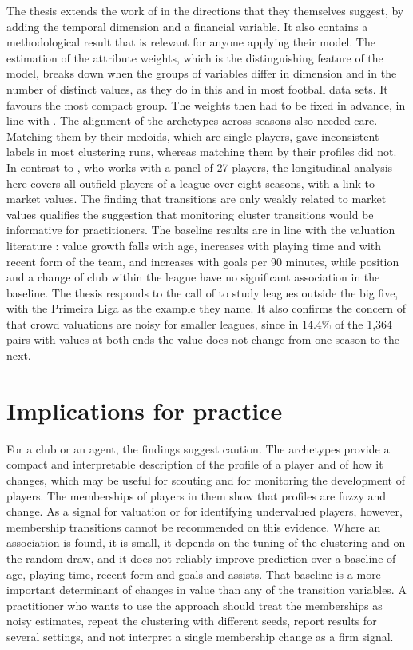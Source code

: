 The thesis extends the work of  in the directions that they themselves suggest, by adding the temporal dimension and a financial variable. It also contains a methodological result that is relevant for anyone applying their model. The estimation of the attribute weights, which is the distinguishing feature of the model, breaks down when the groups of variables differ in dimension and in the number of distinct values, as they do in this and in most football data sets. It favours the most compact group. The weights then had to be fixed in advance, in line with . The alignment of the archetypes across seasons also needed care. Matching them by their medoids, which are single players, gave inconsistent labels in most clustering runs, whereas matching them by their profiles did not. In contrast to , who works with a panel of 27 players, the longitudinal analysis here covers all outfield players of a league over eight seasons, with a link to market values. The finding that transitions are only weakly related to market values qualifies the suggestion that monitoring cluster transitions would be informative for practitioners. The baseline results are in line with the valuation literature \cite{franceschi2024determinants}: value growth falls with age, increases with playing time and with recent form of the team, and increases with goals per 90 minutes, while position and a change of club within the league have no significant association in the baseline. The thesis responds to the call of  to study leagues outside the big five, with the Primeira Liga as the example they name. It also confirms the concern of  that crowd valuations are noisy for smaller leagues, since in 14.4\% of the 1,364 pairs with values at both ends the value does not change from one season to the next.

\section{Implications for practice}
\label{sec:disc-practice}

For a club or an agent, the findings suggest caution. The archetypes provide a compact and interpretable description of the profile of a player and of how it changes, which may be useful for scouting and for monitoring the development of players. The memberships of players in them show that profiles are fuzzy and change. As a signal for valuation or for identifying undervalued players, however, membership transitions cannot be recommended on this evidence. Where an association is found, it is small, it depends on the tuning of the clustering and on the random draw, and it does not reliably improve prediction over a baseline of age, playing time, recent form and goals and assists. That baseline is a more important determinant of changes in value than any of the transition variables. A practitioner who wants to use the approach should treat the memberships as noisy estimates, repeat the clustering with different seeds, report results for several settings, and not interpret a single membership change as a firm signal.


